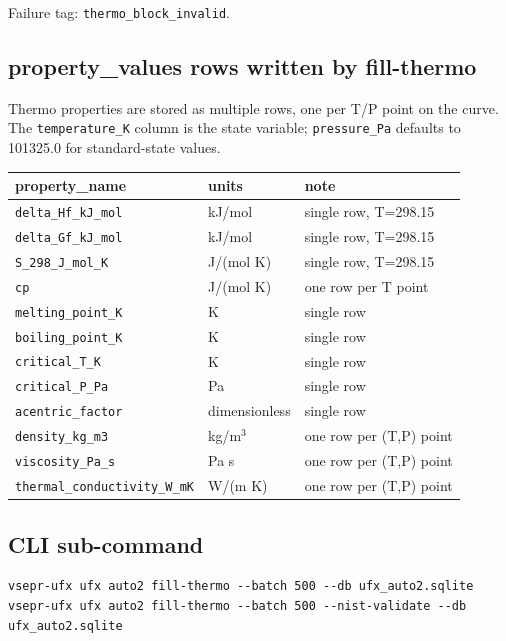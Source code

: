 \documentclass[11pt, a4paper]{article}
\begin{document}
Failure tag: \texttt{thermo\_block\_invalid}.

\subsection{property\_values rows written by fill-thermo}

Thermo properties are stored as multiple rows, one per T/P point on the curve.
The \texttt{temperature\_K} column is the state variable; \texttt{pressure\_Pa}
defaults to 101325.0 for standard-state values.

\begin{center}
\begin{tabular}{lll}
\toprule
\textbf{property\_name} & \textbf{units} & \textbf{note} \\
\midrule
\texttt{delta\_Hf\_kJ\_mol}       & kJ/mol        & single row, T=298.15 \\
\texttt{delta\_Gf\_kJ\_mol}       & kJ/mol        & single row, T=298.15 \\
\texttt{S\_298\_J\_mol\_K}        & J/(mol K)     & single row, T=298.15 \\
\texttt{cp}                       & J/(mol K)     & one row per T point \\
\texttt{melting\_point\_K}        & K             & single row \\
\texttt{boiling\_point\_K}        & K             & single row \\
\texttt{critical\_T\_K}           & K             & single row \\
\texttt{critical\_P\_Pa}          & Pa            & single row \\
\texttt{acentric\_factor}         & dimensionless & single row \\
\texttt{density\_kg\_m3}          & kg/m\(^3\)    & one row per (T,P) point \\
\texttt{viscosity\_Pa\_s}         & Pa s          & one row per (T,P) point \\
\texttt{thermal\_conductivity\_W\_mK} & W/(m K)  & one row per (T,P) point \\
\bottomrule
\end{tabular}
\end{center}

\subsection{CLI sub-command}

\begin{lstlisting}[language={}]
vsepr-ufx ufx auto2 fill-thermo --batch 500 --db ufx_auto2.sqlite
vsepr-ufx ufx auto2 fill-thermo --batch 500 --nist-validate --db ufx_auto2.sqlite
\end{lstlisting}
\end{document}
